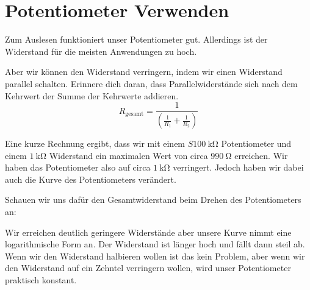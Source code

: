 \documentclass[a4paper,12pt]{book}
\begin{document}
\section*{Potentiometer Verwenden}

Zum Auslesen funktioniert unser Potentiometer gut.
Allerdings ist der Widerstand für die meisten Anwendungen zu hoch.

Aber wir können den Widerstand verringern, indem wir einen Widerstand parallel schalten.
Erinnere dich daran, dass Parallelwiderstände sich nach dem Kehrwert der Summe der Kehrwerte addieren.
\[
  R_{\text{gesamt}} = \frac{1}{\left( \frac{1}{R_1} + \frac{1}{R_2} \right)}
\]


Eine kurze Rechnung ergibt, dass wir mit einem $S\SI{100}{\kohm}$ Potentiometer und einem $\SI{1}{\kohm}$ Widerstand
ein maximalen Wert von circa $\SI{990}{\ohm}$ erreichen.
Wir haben das Potentiometer also auf circa $\SI{1}{\kohm}$ verringert.
Jedoch haben wir dabei auch die Kurve des Potentiometers verändert.

Schauen wir uns dafür den Gesamtwiderstand beim Drehen des Potentiometers an:
\begin{center}
\end{center}
Wir erreichen deutlich geringere Widerstände aber unsere Kurve nimmt eine logarithmische Form an.
Der Widerstand ist länger hoch und fällt dann steil ab.
Wenn wir den Widerstand halbieren wollen ist das kein Problem, aber wenn wir den Widerstand auf ein Zehntel verringern wollen, wird unser Potentiometer
praktisch konstant.
\end{document}
